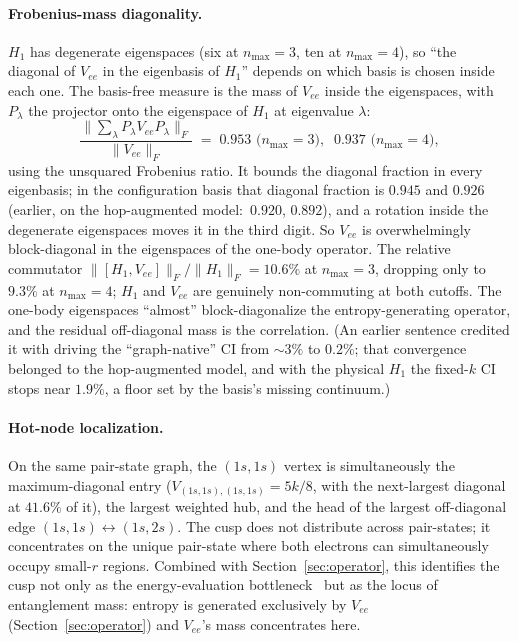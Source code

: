\documentclass[twocolumn,pra,amsmath,amssymb,superscriptaddress]{revtex4-2}
\begin{document}
\paragraph*{Frobenius-mass diagonality.}  $H_1$ has degenerate
eigenspaces (six at $n_{\max}=3$, ten at $n_{\max}=4$), so ``the
diagonal of $V_{ee}$ in the eigenbasis of $H_1$'' depends on which
basis is chosen inside each one.  The basis-free measure is the mass
of $V_{ee}$ inside the eigenspaces, with $P_\lambda$ the projector
onto the eigenspace of $H_1$ at eigenvalue $\lambda$:
\begin{equation}
  \frac{\bigl\lVert \sum_\lambda P_\lambda V_{ee} P_\lambda\bigr\rVert_F}
       {\lVert V_{ee}\rVert_F}
  \;=\; 0.953 \text{ (}n_{\max}=3\text{)},
  \;\; 0.937 \text{ (}n_{\max}=4\text{)},
\end{equation}
using the unsquared Frobenius ratio.  It bounds the diagonal fraction
in every eigenbasis; in the configuration basis that diagonal fraction
is $0.945$ and $0.926$ (earlier, on the hop-augmented model:\ $0.920$,
$0.892$), and a rotation inside the degenerate eigenspaces moves it in
the third digit.  So $V_{ee}$ is overwhelmingly block-diagonal in the
eigenspaces of the one-body operator.  The relative commutator
$\lVert [H_1, V_{ee}]\rVert_F / \lVert H_1 \rVert_F = 10.6\%$ at
$n_{\max}=3$, dropping only to $9.3\%$ at $n_{\max}=4$; $H_1$ and
$V_{ee}$ are genuinely non-commuting at both cutoffs.  The one-body eigenspaces
``almost'' block-diagonalize the entropy-generating operator, and the
residual off-diagonal mass is the correlation.  (An earlier sentence
credited it with driving the ``graph-native'' CI from $\sim\!3\%$ to
$0.2\%$; that convergence belonged to the hop-augmented model, and with
the physical $H_1$ the fixed-$k$ CI stops near $1.9\%$, a floor set by
the basis's missing continuum.)

\paragraph*{Hot-node localization.}  On the same pair-state
graph, the $(1s,1s)$ vertex is simultaneously the
maximum-diagonal entry ($V_{(1s,1s),(1s,1s)} = 5k/8$, with the
next-largest diagonal at $41.6\%$ of it), the largest weighted hub, and
the head of the largest off-diagonal edge
$(1s,1s)\leftrightarrow(1s,2s)$.  The cusp does not distribute
across pair-states; it concentrates on the unique pair-state
where both electrons can simultaneously occupy small-$r$
regions.  Combined with Section~\ref{sec:operator}, this
identifies the cusp not only as the energy-evaluation
bottleneck~\cite{GeoVac_Paper18} but as the locus of entanglement
mass: entropy is generated exclusively by $V_{ee}$
(Section~\ref{sec:operator}) and $V_{ee}$'s mass concentrates here.
\end{document}
